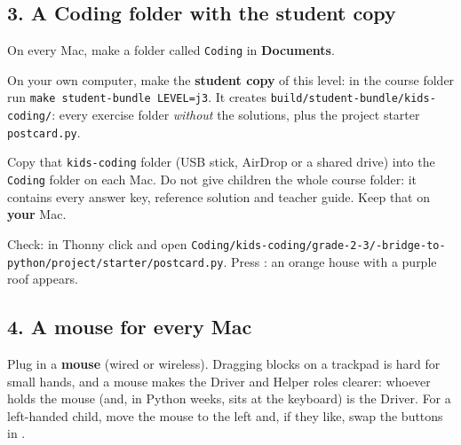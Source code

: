 \documentclass[track=junior,level=3,teacher]{kidscode}
\begin{document}
\subsection{3. A Coding folder with the student copy}
\begin{checklist}
  \item On every Mac, make a folder called \texttt{Coding} in \textbf{Documents}.
  \item On your own computer, make the \textbf{student copy} of this level: in the course folder run
        \texttt{make student-bundle LEVEL=j3}. It creates
        \texttt{build/\allowbreak student-bundle/\allowbreak kids-coding/}: every exercise folder
        \emph{without} the solutions, plus the project starter \texttt{postcard.py}.
  \item Copy that \texttt{kids-coding} folder (USB stick, AirDrop or a shared drive) into the
        \texttt{Coding} folder on each Mac. Do not give children the whole course folder: it contains
        every answer key, reference solution and teacher guide. Keep that on \textbf{your} Mac.
  \item Check: in Thonny click  and open
        \texttt{Coding/\allowbreak kids-coding/\allowbreak grade-2-3/-bridge-to-python/\allowbreak project/\allowbreak starter/\allowbreak postcard.py}.
        Press : an orange house with a purple roof appears.
\end{checklist}

\subsection{4. A mouse for every Mac}
Plug in a \textbf{mouse} (wired or wireless). Dragging blocks on a trackpad is hard for small hands,
and a mouse makes the Driver and Helper roles clearer: whoever holds the mouse (and, in Python weeks,
sits at the keyboard) is the Driver. For a left-handed child, move the mouse to the left and, if they
like, swap the buttons in .
\end{document}

